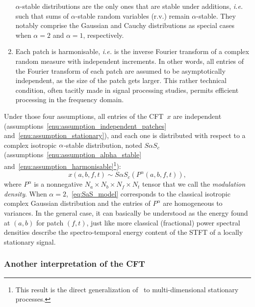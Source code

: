 \begin{enumerate}[leftmargin=0cm,itemindent=.5cm,labelwidth=\itemindent,labelsep=0cm,align=left]
$\alpha$-stable distributions are the only ones that are stable under additions, \emph{i.e.} such that
sums of $\alpha$-stable random variables (r.v.) remain $\alpha$-stable.
They notably comprise the Gaussian and Cauchy distributions as special
cases when $\alpha=2$ and $\alpha=1$, respectively.\label{enu:assumption_alpha_stable}
\item Each patch is harmonisable, \emph{i.e.} is the inverse Fourier
transform of a complex random measure with independent increments.
In other words, all entries of the Fourier transform of each patch
are assumed to be asymptotically independent, as the size of the patch
gets larger. This rather technical condition, often tacitly made in
signal processing studies, permits efficient processing in the frequency
domain.\label{enu:assumption_harmonisable}
\end{enumerate}

Under those four assumptions, all entries of the CFT~$x$ are independent
(assumptions~\ref{enu:assumption_independent_patches} and~\ref{enu:assumption_stationary}),
and each one is distributed with respect to a complex isotropic $\text{\ensuremath{\alpha}}$-stable
distribution, noted $S\alpha S_{c}$ (assumptions~\ref{enu:assumption_alpha_stable}
and~\ref{enu:assumption_harmonisable}\footnote{This result is the direct generalization
of~\cite[th. 6.5.1]{samoradnitsky94} to multi-dimensional stationary processes.}):
\begin{equation}
x\left(a,b,f,t\right)\sim S\alpha S_{c}\left(P^{\alpha}\left(a,b,f,t\right)\right),\label{eq:SaS_model}
\end{equation}
where $P^{\alpha}$ is a nonnegative $N_{a}\times N_{b}\times N_{f}\times N_{t}$
tensor that we call the \emph{modulation density}. When $\alpha=2$,~\eqref{eq:SaS_model}
corresponds to the classical isotropic complex Gaussian distribution
and the entries of $P^{\alpha}$ are homogeneous to variances. In
the general case, it can basically be understood as the energy found at $\left(a,b\right)$ for patch
$\left(f,t\right)$, just like more classical (fractional) power spectral
densities describe the spectro-temporal energy content of the STFT
of a locally stationary signal.

\subsubsection{Another interpretation of the CFT}

\label{sub:interpretation}

